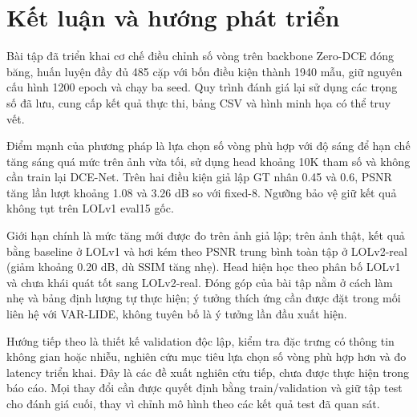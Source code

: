 \section{Kết luận và hướng phát triển}
Bài tập đã triển khai cơ chế điều chỉnh số vòng trên backbone Zero-DCE đóng băng, huấn luyện đầy đủ 485 cặp với bốn điều kiện thành 1940 mẫu, giữ nguyên cấu hình 1200 epoch và chạy ba seed. Quy trình đánh giá lại sử dụng các trọng số đã lưu, cung cấp kết quả thực thi, bảng CSV và hình minh họa có thể truy vết.

Điểm mạnh của phương pháp là lựa chọn số vòng phù hợp với độ sáng để hạn chế tăng sáng quá mức trên ảnh vừa tối, sử dụng head khoảng 10K tham số và không cần train lại DCE-Net. Trên hai điều kiện giả lập GT nhân 0.45 và 0.6, PSNR tăng lần lượt khoảng 1.08 và 3.26 dB so với fixed-8. Ngưỡng bảo vệ giữ kết quả không tụt trên LOLv1 eval15 gốc.

Giới hạn chính là mức tăng mới được đo trên ảnh giả lập; trên ảnh thật, kết quả bằng baseline ở LOLv1 và hơi kém theo PSNR trung bình toàn tập ở LOLv2-real (giảm khoảng 0.20 dB, dù SSIM tăng nhẹ). Head hiện học theo phân bố LOLv1 và chưa khái quát tốt sang LOLv2-real. Đóng góp của bài tập nằm ở cách làm nhẹ và bảng định lượng tự thực hiện; ý tưởng thích ứng cần được đặt trong mối liên hệ với VAR-LIDE, không tuyên bố là ý tưởng lần đầu xuất hiện.

Hướng tiếp theo là thiết kế validation độc lập, kiểm tra đặc trưng có thông tin không gian hoặc nhiễu, nghiên cứu mục tiêu lựa chọn số vòng phù hợp hơn và đo latency triển khai. Đây là các đề xuất nghiên cứu tiếp, chưa được thực hiện trong báo cáo. Mọi thay đổi cần được quyết định bằng train/validation và giữ tập test cho đánh giá cuối, thay vì chỉnh mô hình theo các kết quả test đã quan sát.
